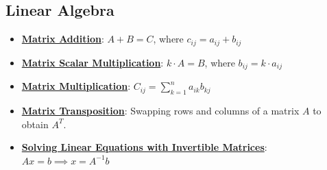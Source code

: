 \documentclass{article}%
\begin{document}
\subsection{Linear Algebra}%
\label{subsec:LinearAlgebra}%
\begin{itemize}[leftmargin=*]%
\item \href{https://purdue.brightspace.com/d2l/common/assets/pdfjs-d2l-dist/1.0.14-legacy/web/viewer.html?file=%2Fcontent%2Fenforced%2F1095467-wl.202510.CS.24300.001%2F04L1-Linear Algebra Primer.pdf%3Fou%3D1095467&lang=en-us&container=d2l-fileviewer-rendered-pdf&fullscreen=d2l-fileviewer-rendered-pdf-dialog&height=667#page=9}{\textbf{Matrix Addition}}: $A + B = C$, where $c_{ij} = a_{ij} + b_{ij}$%
\item \href{https://purdue.brightspace.com/d2l/common/assets/pdfjs-d2l-dist/1.0.14-legacy/web/viewer.html?file=%2Fcontent%2Fenforced%2F1095467-wl.202510.CS.24300.001%2F04L1-Linear Algebra Primer.pdf%3Fou%3D1095467&lang=en-us&container=d2l-fileviewer-rendered-pdf&fullscreen=d2l-fileviewer-rendered-pdf-dialog&height=667#page=9}{\textbf{Matrix Scalar Multiplication}}: $k \cdot A = B$, where $b_{ij} = k \cdot a_{ij}$%
\item \href{https://purdue.brightspace.com/d2l/common/assets/pdfjs-d2l-dist/1.0.14-legacy/web/viewer.html?file=%2Fcontent%2Fenforced%2F1095467-wl.202510.CS.24300.001%2F04L1-Linear Algebra Primer.pdf%3Fou%3D1095467&lang=en-us&container=d2l-fileviewer-rendered-pdf&fullscreen=d2l-fileviewer-rendered-pdf-dialog&height=667#page=14}{\textbf{Matrix Multiplication}}: $C_{ij} = \sum_{k=1}^{n} a_{ik}b_{kj}$%
\item \href{https://purdue.brightspace.com/d2l/common/assets/pdfjs-d2l-dist/1.0.14-legacy/web/viewer.html?file=%2Fcontent%2Fenforced%2F1095467-wl.202510.CS.24300.001%2F04L1-Linear Algebra Primer.pdf%3Fou%3D1095467&lang=en-us&container=d2l-fileviewer-rendered-pdf&fullscreen=d2l-fileviewer-rendered-pdf-dialog&height=667#page=16}{\textbf{Matrix Transposition}}: Swapping rows and columns of a matrix $A$ to obtain $A^T$.%
\item \href{https://purdue.brightspace.com/d2l/common/assets/pdfjs-d2l-dist/1.0.14-legacy/web/viewer.html?file=%2Fcontent%2Fenforced%2F1095467-wl.202510.CS.24300.001%2F04L1-Linear Algebra Primer.pdf%3Fou%3D1095467&lang=en-us&container=d2l-fileviewer-rendered-pdf&fullscreen=d2l-fileviewer-rendered-pdf-dialog&height=667#page=12}{\textbf{Solving Linear Equations with Invertible Matrices}}: $Ax = b \implies x = A^{-1}b$%
\end{itemize}
\end{document}
